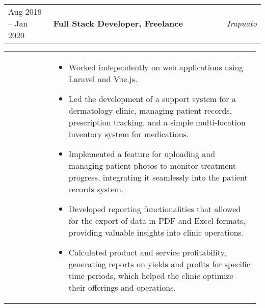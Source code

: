 \documentclass[letter,10pt]{article}
\begin{document}
\begin{tabular}{@{} p{0.18\linewidth} p{0.704\linewidth} p{0.2\linewidth} @{}}
Aug 2019 -- Jan 2020 & \textbf{Full Stack Developer, Freelance}  & \textit{Irapuato}
\end{tabular}
\vspace{-3mm}
\par
\begin{tabular}{@{} p{0.18\linewidth} p{0.7965\linewidth} @{}}
&
\begin{itemize}[leftmargin=*, nosep]
	\item Worked independently on web applications using Laravel and Vue.js.
	\item Led the development of a support system for a dermatology clinic, managing patient records, prescription tracking, and a simple multi-location inventory system for medications.
	\item Implemented a feature for uploading and managing patient photos to monitor treatment progress, integrating it seamlessly into the patient records system.
	\item Developed reporting functionalities that allowed for the export of data in PDF and Excel formats, providing valuable insights into clinic operations.
	\item Calculated product and service profitability, generating reports on yields and profits for specific time periods, which helped the clinic optimize their offerings and operations.
\end{itemize}
\end{tabular}
\vspace{-0.48mm}
\end{document}
